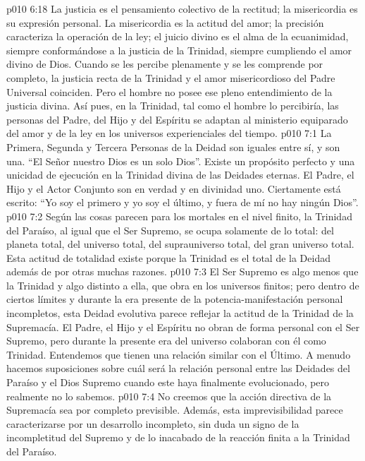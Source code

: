 \vs p010 6:18 La justicia es el pensamiento colectivo de la rectitud; la misericordia es su expresión personal. La misericordia es la actitud del amor; la precisión caracteriza la operación de la ley; el juicio divino es el alma de la ecuanimidad, siempre conformándose a la justicia de la Trinidad, siempre cumpliendo el amor divino de Dios. Cuando se les percibe plenamente y se les comprende por completo, la justicia recta de la Trinidad y el amor misericordioso del Padre Universal coinciden. Pero el hombre no posee ese pleno entendimiento de la justicia divina. Así pues, en la Trinidad, tal como el hombre lo percibiría, las personas del Padre, del Hijo y del Espíritu se adaptan al ministerio equiparado del amor y de la ley en los universos experienciales del tiempo.
\vs p010 7:1 La Primera, Segunda y Tercera Personas de la Deidad son iguales entre sí, y son una. “El Señor nuestro Dios es un solo Dios”. Existe un propósito perfecto y una unicidad de ejecución en la Trinidad divina de las Deidades eternas. El Padre, el Hijo y el Actor Conjunto son en verdad y en divinidad uno. Ciertamente está escrito: “Yo soy el primero y yo soy el último, y fuera de mí no hay ningún Dios”.
\vs p010 7:2 \pc Según las cosas parecen para los mortales en el nivel finito, la Trinidad del Paraíso, al igual que el Ser Supremo, se ocupa solamente de lo total: del planeta total, del universo total, del suprauniverso total, del gran universo total. Esta actitud de totalidad existe porque la Trinidad es el total de la Deidad además de por otras muchas razones.
\vs p010 7:3 El Ser Supremo es algo menos que la Trinidad y algo distinto a ella, que obra en los universos finitos; pero dentro de ciertos límites y durante la era presente de la potencia\hyp{}manifestación personal incompletos, esta Deidad evolutiva parece reflejar la actitud de la Trinidad de la Supremacía. El Padre, el Hijo y el Espíritu no obran de forma personal con el Ser Supremo, pero durante la presente era del universo colaboran con él como Trinidad. Entendemos que tienen una relación similar con el Último. A menudo hacemos suposiciones sobre cuál será la relación personal entre las Deidades del Paraíso y el Dios Supremo cuando este haya finalmente evolucionado, pero realmente no lo sabemos.
\vs p010 7:4 \pc No creemos que la acción directiva de la Supremacía sea por completo previsible. Además, esta imprevisibilidad parece caracterizarse por un desarrollo incompleto, sin duda un signo de la incompletitud del Supremo y de lo inacabado de la reacción finita a la Trinidad del Paraíso.
